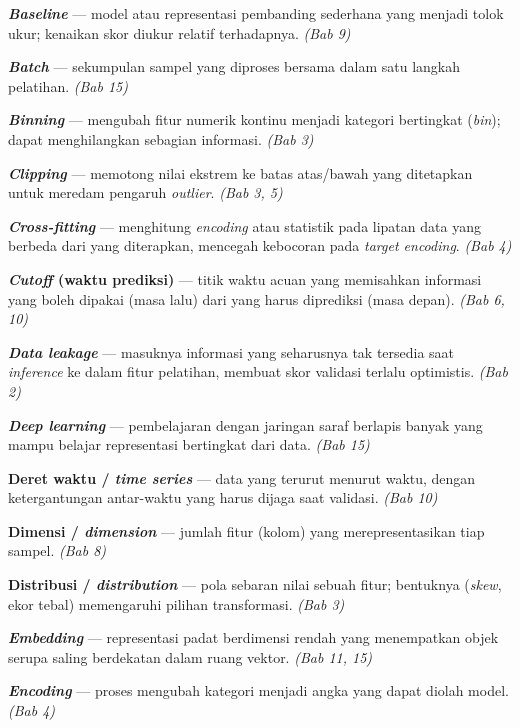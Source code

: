 \textbf{\emph{Baseline}} --- model atau representasi pembanding sederhana yang menjadi tolok
ukur; kenaikan skor diukur relatif terhadapnya. \emph{(Bab 9)}

\textbf{\emph{Batch}} --- sekumpulan sampel yang diproses bersama dalam satu langkah
pelatihan. \emph{(Bab 15)}

\textbf{\emph{Binning}} --- mengubah fitur numerik kontinu menjadi kategori bertingkat
(\emph{bin}); dapat menghilangkan sebagian informasi. \emph{(Bab 3)}


\textbf{\emph{Clipping}} --- memotong nilai ekstrem ke batas atas/bawah yang ditetapkan untuk
meredam pengaruh \emph{outlier}. \emph{(Bab 3, 5)}

\textbf{\emph{Cross-fitting}} --- menghitung \emph{encoding} atau statistik pada lipatan data yang
berbeda dari yang diterapkan, mencegah kebocoran pada \emph{target encoding}. \emph{(Bab 4)}

\textbf{\emph{Cutoff} (waktu prediksi)} --- titik waktu acuan yang memisahkan informasi yang
boleh dipakai (masa lalu) dari yang harus diprediksi (masa depan). \emph{(Bab 6, 10)}


\textbf{\emph{Data leakage}} --- masuknya informasi yang seharusnya tak tersedia saat
\emph{inference} ke dalam fitur pelatihan, membuat skor validasi terlalu optimistis.
\emph{(Bab 2)}

\textbf{\emph{Deep learning}} --- pembelajaran dengan jaringan saraf berlapis banyak yang
mampu belajar representasi bertingkat dari data. \emph{(Bab 15)}

\textbf{Deret waktu / \emph{time series}} --- data yang terurut menurut waktu, dengan
ketergantungan antar-waktu yang harus dijaga saat validasi. \emph{(Bab 10)}

\textbf{Dimensi / \emph{dimension}} --- jumlah fitur (kolom) yang merepresentasikan tiap
sampel. \emph{(Bab 8)}

\textbf{Distribusi / \emph{distribution}} --- pola sebaran nilai sebuah fitur; bentuknya
(\emph{skew}, ekor tebal) memengaruhi pilihan transformasi. \emph{(Bab 3)}


\textbf{\emph{Embedding}} --- representasi padat berdimensi rendah yang menempatkan objek
serupa saling berdekatan dalam ruang vektor. \emph{(Bab 11, 15)}

\textbf{\emph{Encoding}} --- proses mengubah kategori menjadi angka yang dapat diolah model.
\emph{(Bab 4)}

